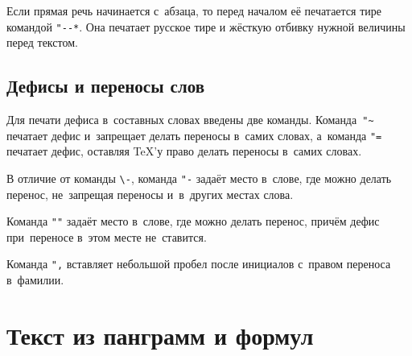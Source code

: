 Если прямая речь начинается с~абзаца, то перед началом её печатается тире
командой \verb|"--*|. Она печатает русское тире и жёсткую отбивку нужной
величины перед текстом.

\subsection{Дефисы и переносы слов}
Для печати дефиса в~составных словах введены две команды. Команда~\verb|"~|
печатает дефис и~запрещает делать переносы в~самих словах, а~команда \verb|"=|
печатает дефис, оставляя \TeX ’у право делать переносы в~самих словах.

В отличие от команды \verb|\-|, команда \verb|"-| задаёт место в~слове, где
можно делать перенос, не~запрещая переносы и~в~других местах слова.

Команда \verb|""| задаёт место в~слове, где можно делать перенос, причём дефис
при~переносе в~этом месте не~ставится.

Команда \verb|",| вставляет небольшой пробел после инициалов с~правом переноса
в~фамилии.

\section{Текст из панграмм и формул}

